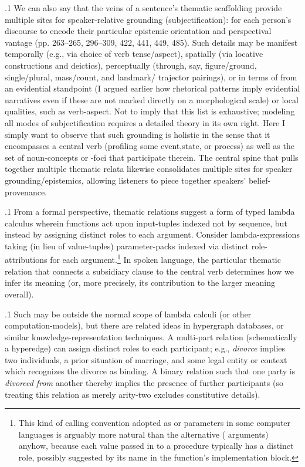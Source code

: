 \documentclass[11pt, twocolumn]{article}
\begin{document}
\p.1{%
\:\+We can also say that the veins of a sentence's thematic scaffolding
provide multiple sites for speaker-relative grounding
(subjectification): for
each person's discourse to encode their particular epistemic
orientation and perspectival vantage (pp. 263--265, 296--309, 422, 
441, 449, 485). \>  Such details may
be manifest temporally (e.g., via choice of verb tense/aspect),
spatially (via locative constructions and deictics), perceptually
(through, say, figure/ground, single/plural,
mass/count, and landmark/ trajector pairings),
or in terms of  from an evidential
standpoint (I argued earlier how rhetorical patterns
imply evidential narratives even if these are not marked
directly on a morphological scale) or local qualities, such as
verb-aspect. \>  Not to imply that this list is exhaustive;
modeling all modes of subjectification requires a detailed
theory in its own right. \>  Here I simply want to observe that
such grounding is holistic in the sense that it encompasses
a central verb (profiling some event,state,
or process) as well as
the set of noun-concepts or -foci that participate therein. \> 
The central spine that pulls together multiple thematic
relata likewise consolidates multiple sites for speaker
grounding/epistemics, allowing listeners to piece together
speakers' belief-provenance.\<\;
}%

\p.1{%
\:\+From a formal perspective, thematic relations suggest a
form of typed lambda calculus wherein functions act upon
input-tuples indexed not by sequence, but instead by
assigning distinct roles to each argument. \> 
Consider lambda-expressions taking (in lieu of
value-tuples) parameter-packs indexed via
distinct role-attributions for each argument.\footnote{
\label{fn:cc} This kind of calling convention
\mdash{} adopted as  or  parameters
in some computer languages \mdash{} is arguably
more natural than the alternative (
arguments) anyhow, because each value passed in to a procedure
typically has a distinct role, possibly suggested by its
name in the function's implementation
block.}  In spoken language, the particular
thematic relation that connects a subsidiary clause to the
central verb determines how we infer its meaning
(or, more precisely, its contribution to the larger meaning overall).\<\;
}%

\p.1{%
\:\+Such  may be outside the normal
scope of lambda calculi (or other computation-models), but there are
related ideas in
hypergraph databases, or similar knowledge-representation techniques. \> 
A multi-part relation (schematically a hyperedge) can assign distinct roles
to each participant; e.g., \textit{divorce} implies two individuals,
a prior situation of marriage, and some legal entity or
context which recognizes the divorce as binding. \> 
A binary relation such that one party is \textit{divorced from}
another thereby implies the presence of further participants
(so treating this relation as merely arity-two excludes constitutive
details).\<\;
}%
\end{document}

